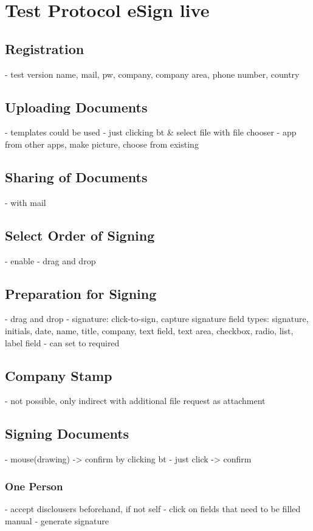 \section{Test Protocol eSign live}

\subsection{Registration}
- test version name, mail, pw, company, company area, phone number, country

\subsection{Uploading Documents}
- templates could be used
- just clicking bt \& select file with file chooser
- app from other apps, make picture, choose from existing

\subsection{Sharing of Documents}
- with mail

\subsection{Select Order of Signing}
- enable
- drag and drop

\subsection{Preparation for Signing}

- drag and drop 
- signature: click-to-sign, capture signature
field types: signature, initials, date, name, title, company, text field, text area, checkbox, radio, list, label field
- can set to required

\subsection{Company Stamp}
- not possible, only indirect with additional file request as attachment

\subsection{Signing Documents}
- mouse(drawing) -> confirm by clicking bt
- just click -> confirm

\subsubsection{One Person}
- accept disclousers beforehand, if not self
- click on fields that need to be filled manual
- generate signature

